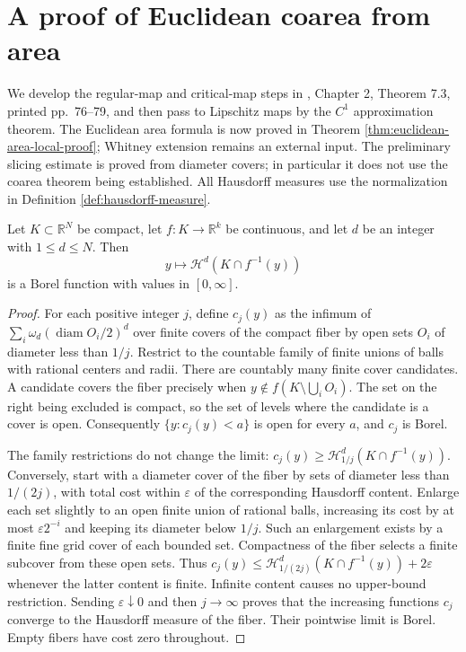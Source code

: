 \chapter{A proof of Euclidean coarea from area}\label{sec:euclidean-coarea-from-area}
We develop the regular-map and critical-map steps in \cite{Sim18}, Chapter 2, Theorem 7.3, printed pp.~76--79, and then pass to Lipschitz maps by the $C^1$ approximation theorem. The Euclidean area formula is now proved in Theorem \ref{thm:euclidean-area-local-proof}; Whitney extension remains an external input. The preliminary slicing estimate is proved from diameter covers; in particular it does not use the coarea theorem being established. All Hausdorff measures use the normalization in Definition \ref{def:hausdorff-measure}.

\begin{lemma}\label{lem:compact-fiber-measure-borel}
Let $K\subset\mathbb R^N$ be compact, let $f:K\to\mathbb R^k$ be continuous, and let $d$ be an integer with $1\leq d\leq N$. Then
\[
 y\longmapsto\mathcal H^d(K\cap f^{-1}(y))
\]
is a Borel function with values in $[0,\infty]$.
\end{lemma}
\begin{proof}
For each positive integer $j$, define $c_j(y)$ as the infimum of $\sum_i\omega_d(\operatorname{diam}O_i/2)^d$ over finite covers of the compact fiber by open sets $O_i$ of diameter less than $1/j$. Restrict to the countable family of finite unions of balls with rational centers and radii. There are countably many finite cover candidates. A candidate covers the fiber precisely when $y\notin f(K\setminus\bigcup_iO_i)$. The set on the right being excluded is compact, so the set of levels where the candidate is a cover is open. Consequently $\{y:c_j(y)<a\}$ is open for every $a$, and $c_j$ is Borel.

The family restrictions do not change the limit: $c_j(y)\geq\mathcal H^d_{1/j}(K\cap f^{-1}(y))$. Conversely, start with a diameter cover of the fiber by sets of diameter less than $1/(2j)$, with total cost within $\varepsilon$ of the corresponding Hausdorff content. Enlarge each set slightly to an open finite union of rational balls, increasing its cost by at most $\varepsilon2^{-i}$ and keeping its diameter below $1/j$. Such an enlargement exists by a finite fine grid cover of each bounded set. Compactness of the fiber selects a finite subcover from these open sets. Thus $c_j(y)\leq\mathcal H^d_{1/(2j)}(K\cap f^{-1}(y))+2\varepsilon$ whenever the latter content is finite. Infinite content causes no upper-bound restriction. Sending $\varepsilon\downarrow0$ and then $j\to\infty$ proves that the increasing functions $c_j$ converge to the Hausdorff measure of the fiber. Their pointwise limit is Borel. Empty fibers have cost zero throughout.
\end{proof}

